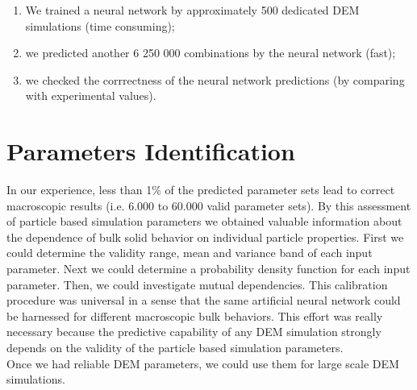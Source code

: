 \begin{enumerate}
\item{We trained a neural network by approximately 500 dedicated \acs{DEM} simulations
(time consuming);}
\item{we predicted another 6 250 000 combinations by the neural network
(fast);}
\item{we checked the corrrectness of the neural network predictions (by
comparing with experimental  values).}
\end{enumerate}

\section{Parameters Identification}
\label{sec:parametersidentification}

In our experience, less than 1\% of the predicted parameter sets lead to correct
macroscopic results (i.e. 6.000 to 60.000 valid parameter sets).
By this assessment of particle based simulation parameters we obtained valuable
information about the dependence of bulk solid behavior on individual particle properties.
First we could determine the validity range, mean and variance band of each
input parameter. Next we could determine a probability density function for each
input parameter. Then, we could investigate mutual dependencies.
This calibration procedure was universal in a sense that the same artificial
neural network could be harnessed for different macroscopic bulk behaviors.
This effort was really necessary because the predictive capability of any
\acs{DEM} simulation strongly depends on the validity of the particle 
based simulation parameters.\\
Once we had reliable \acs{DEM} parameters, we could use them for large scale \acs{DEM}
simulations.
